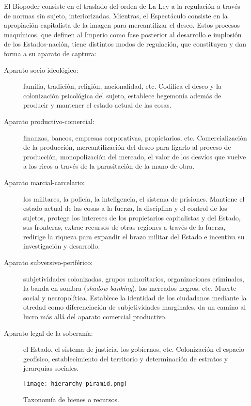 El Biopoder consiste en el traslado del orden de La Ley a la regulación a través de normas sin sujeto, interiorizadas. Mientras, el Espectáculo consiste en la apropiación capitalista de la imagen para mercantilizar el deseo. Estos procesos maquínicos, que definen al Imperio como fase posterior al desarrollo e implosión de los Estados-nación, tiene distintos modos de regulación, que constituyen y dan forma a su aparato de captura:

\begin{description}
	\item[Aparato socio-ideológico:] familia, tradición, religión, nacionalidad, etc. Codifica el deseo y la colonización psicológica del sujeto, establece hegemonía además de producir y mantener el estado actual de las cosas.

	\item[Aparato productivo-comercial:] finanzas, bancos, empresas corporativas, propietarios, etc. Comercialización de la producción, mercantilización del deseo para ligarlo al proceso de producción, monopolización del mercado, el valor de los desvíos que vuelve a los ricos a través de la parasitación de la mano de obra.

	\item[Aparato marcial-carcelario:] los militares, la policía, la inteligencia, el sistema de prisiones. Mantiene el estado actual de las cosas a la fuerza, la disciplina y el control de los sujetos, protege los intereses de los propietarios capitalistas y del Estado, sus fronteras, extrae recursos de otras regiones a través de la fuerza, redirige la riqueza para expandir el brazo militar del Estado e incentiva su investigación y desarrollo.

	\item[Aparato subversivo-periférico:] subjetividades colonizadas, grupos minoritarios, organizaciones criminales, la banda en sombra (\emph{shadow banking}), los mercados negros, etc. Muerte social y necropolítica. Establece la identidad de los ciudadanos mediante la otredad como diferenciación de subjetividades marginales, da un camino al lucro más allá del aparato comercial productivo.

	\item[Aparato legal de la soberanía:] el Estado, el sistema de justicia, los gobiernos, etc. Colonización el espacio geofísico, establecimiento del territorio y determinación de estratos y jerarquías sociales.
\end{description}

\begin{figure}[htbp]
	\centering
	\texttt{[image: hierarchy-piramid.png]}
	\caption{Taxonomía de bienes o recursos.}
	\label{fig:piramide}
\end{figure}

